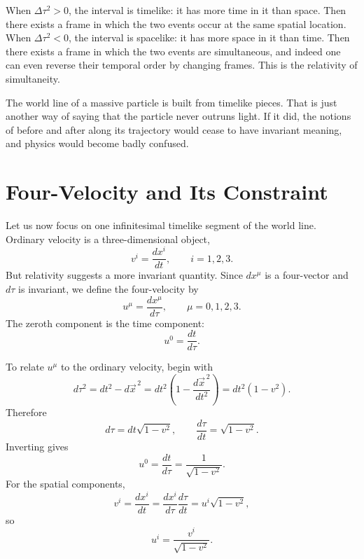 When \(\Delta \tau^2>0\), the interval is timelike: it has more time in it than space. Then there exists a frame in which the two events occur at the same spatial location. When \(\Delta \tau^2<0\), the interval is spacelike: it has more space in it than time. Then there exists a frame in which the two events are simultaneous, and indeed one can even reverse their temporal order by changing frames. This is the relativity of simultaneity.

The world line of a massive particle is built from timelike pieces. That is just another way of saying that the particle never outruns light. If it did, the notions of before and after along its trajectory would cease to have invariant meaning, and physics would become badly confused.

\section{Four-Velocity and Its Constraint}

Let us now focus on one infinitesimal timelike segment of the world line. Ordinary velocity is a three-dimensional object,
\begin{equation}
v^i=\frac{dx^i}{dt},
\qquad i=1,2,3.
\end{equation}
But relativity suggests a more invariant quantity. Since \(dx^\mu\) is a four-vector and \(d\tau\) is invariant, we define the four-velocity by
\begin{equation}
u^\mu=\frac{dx^\mu}{d\tau},
\qquad \mu=0,1,2,3.
\end{equation}
The zeroth component is the time component:
\begin{equation}
u^0=\frac{dt}{d\tau}.
\end{equation}

To relate \(u^\mu\) to the ordinary velocity, begin with
\begin{equation}
d\tau^2 = dt^2-d\vec x^{\,2}
=
dt^2\left(1-\frac{d\vec x^{\,2}}{dt^2}\right)
=
dt^2(1-v^2).
\end{equation}
Therefore
\begin{equation}
d\tau = dt\sqrt{1-v^2},
\qquad
\frac{d\tau}{dt}=\sqrt{1-v^2}.
\end{equation}
Inverting gives
\begin{equation}
u^0=\frac{dt}{d\tau}=\frac{1}{\sqrt{1-v^2}}.
\end{equation}
For the spatial components,
\begin{equation}
v^i=\frac{dx^i}{dt}=\frac{dx^i}{d\tau}\frac{d\tau}{dt}=u^i\sqrt{1-v^2},
\end{equation}
so
\begin{equation}
u^i=\frac{v^i}{\sqrt{1-v^2}}.
\end{equation}


